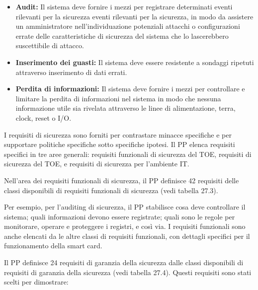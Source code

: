 \begin{itemize}
    \item \textbf{Audit:} Il sistema deve fornire i mezzi per registrare determinati eventi rilevanti per la sicurezza eventi rilevanti per la sicurezza, in modo da assistere un amministratore nell'individuazione potenziali attacchi o configurazioni errate delle caratteristiche di sicurezza del sistema che lo lascerebbero suscettibile di attacco.
    
    \item \textbf{Inserimento dei guasti:} Il sistema deve essere resistente a sondaggi ripetuti attraverso inserimento di dati errati.
    
    \item \textbf{Perdita di informazioni:} Il sistema deve fornire i mezzi per controllare e limitare la perdita di informazioni nel sistema in modo che nessuna informazione utile sia rivelata attraverso le linee di alimentazione, terra, clock, reset o I/O.
\end{itemize}
I requisiti di sicurezza sono forniti per contrastare minacce specifiche e per supportare politiche specifiche sotto specifiche ipotesi. Il PP elenca requisiti specifici in tre aree generali: requisiti funzionali di sicurezza del TOE, requisiti di sicurezza del TOE, e requisiti di sicurezza per l'ambiente IT.

\singlespacing

Nell'area dei requisiti funzionali di sicurezza, il PP definisce 42 requisiti delle classi disponibili di requisiti funzionali di sicurezza (vedi tabella 27.3).

\singlespacing

Per esempio, per l'auditing di sicurezza, il PP stabilisce cosa deve controllare il sistema; quali informazioni devono essere registrate; quali sono le regole per monitorare, operare e proteggere i registri, e così via. I requisiti funzionali sono anche elencati da le altre classi di requisiti funzionali, con dettagli specifici per il funzionamento della smart card.

\singlespacing

Il PP definisce 24 requisiti di garanzia della sicurezza dalle classi disponibili di requisiti di garanzia della sicurezza (vedi tabella 27.4). Questi requisiti sono stati scelti per dimostrare:


